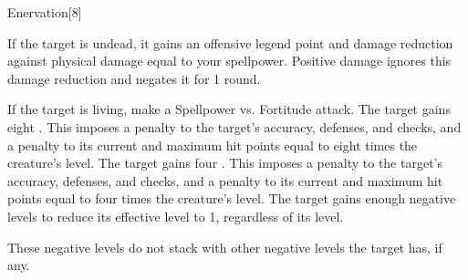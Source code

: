 \begin{spellsection}[Greater]{Enervation}[8]
    \begin{spellheader}
    \end{spellheader}
    \begin{spellcontent}
        \begin{spelltargetinginfo}
        \end{spelltargetinginfo}
        \begin{spelleffects}
            \spelleffect If the target is undead, it gains an offensive legend point and damage reduction against physical damage equal to your spellpower. Positive damage ignores this damage reduction and negates it for 1 round.
            \begin{spellattacktriggered}{If the target is living, make a Spellpower vs. Fortitude attack.}
                \spellsuccess The target gains eight . This imposes a  penalty to the target's accuracy, defenses, and checks, and a penalty to its current and maximum hit points equal to eight times the creature's level.
                \spellfailure The target gains four . This imposes a  penalty to the target's accuracy, defenses, and checks, and a penalty to its current and maximum hit points equal to four times the creature's level.
                \spellcritical The target gains enough negative levels to reduce its effective level to 1, regardless of its level.
            \end{spellattacktriggered}
        \end{spelleffects}
    \end{spellcontent}
    \begin{spellfooter}
        \spellnotes These negative levels do not stack with other negative levels the target has, if any.
        \miscastrandom
    \end{spellfooter}
\end{spellsection}

